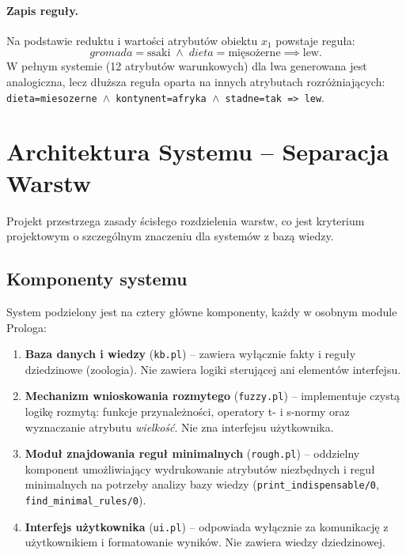 \documentclass[11pt,a4paper]{article}
\newcommand{\code}[1]{\texttt{#1}}
\begin{document}
\paragraph{Zapis reguły.}
Na podstawie reduktu i wartości atrybutów obiektu $x_1$ powstaje reguła:
\[
\textit{gromada}=\text{ssaki} \;\wedge\; \textit{dieta}=\text{mięsożerne}
\implies \text{lew}.
\]
W pełnym systemie (12 atrybutów warunkowych) dla lwa generowana jest analogiczna,
lecz dłuższa reguła oparta na innych atrybutach rozróżniających:
\code{dieta=miesozerne $\wedge$ kontynent=afryka $\wedge$ stadne=tak => lew}.

\section{Architektura Systemu -- Separacja Warstw}
\label{sec:arch}
Projekt przestrzega zasady ścisłego rozdzielenia warstw, co jest kryterium
projektowym o szczególnym znaczeniu dla systemów z bazą wiedzy.

\subsection{Komponenty systemu}
System podzielony jest na cztery główne komponenty, każdy w osobnym module
Prologa:
\begin{enumerate}
    \item \textbf{Baza danych i wiedzy} (\code{kb.pl}) -- zawiera wyłącznie fakty
          i reguły dziedzinowe (zoologia). Nie zawiera logiki sterującej ani
          elementów interfejsu.
    \item \textbf{Mechanizm wnioskowania rozmytego} (\code{fuzzy.pl}) --
          implementuje czystą logikę rozmytą: funkcje przynależności, operatory
          t- i s-normy oraz wyznaczanie atrybutu \textit{wielkość}. Nie zna
          interfejsu użytkownika.
    \item \textbf{Moduł znajdowania reguł minimalnych} (\code{rough.pl}) --
          oddzielny komponent umożliwiający wydrukowanie atrybutów niezbędnych
          i reguł minimalnych na potrzeby analizy bazy wiedzy
          (\code{print\_indispensable/0}, \code{find\_minimal\_rules/0}).
    \item \textbf{Interfejs użytkownika} (\code{ui.pl}) -- odpowiada wyłącznie
          za komunikację z użytkownikiem i formatowanie wyników. Nie zawiera
          wiedzy dziedzinowej.
\end{enumerate}
\end{document}

